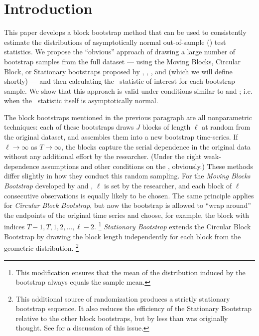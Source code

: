 \documentclass[12pt,fleqn]{article}
\begin{document}
\section{Introduction}

This paper develops a block bootstrap method that can be used to
consistently estimate the distributions of asymptotically normal
out-of-sample (\oos) test statistics. We propose the ``obvious''
approach of drawing a large number of bootstrap samples from the full
dataset --- using the Moving Blocks, Circular Block, or Stationary
bootstraps proposed by \cite{Kun:89}, \cite{LiS:92}, \cite{PoR:92},
and \cite{PoR:94} (which we will define shortly) --- and then
calculating the \oos\ statistic of interest for each bootstrap sample.
We show that this approach is valid under conditions similar to
 and ; i.e. when the \oos\ statistic
itself is asymptotically normal.

The block bootstraps mentioned in the previous paragraph are all
nonparametric techniques: each of these bootstraps draws $J$ blocks of
length $\ell$ at random from the original dataset, and assembles them
into a new bootstrap time-series. If $\ell \to \infty$ as $T \to
\infty$, the blocks capture the serial dependence in the original data
without any additional effort by the researcher. (Under the right
weak-dependence assumptions and other conditions on the \dgp,
obviously.) These methods differ slightly in how they conduct this
random sampling. For the \emph{Moving Blocks Bootstrap} developed by
\cite{Kun:89} and \cite{LiS:92}, $\ell$ is set by the researcher, and
each block of $\ell$ consecutive observations is equally likely to be
chosen. The same principle applies for  \emph{Circular
  Block Bootstrap}, but now the bootstrap is allowed to ``wrap
around'' the endpoints of the original time series and choose, for
example, the block with indices $T-1,T, 1, 2,\dots, \ell - 2$.%
\footnote{This modification ensures that the mean of the distribution
  induced by the bootstrap always equals the sample mean.} %
 \emph{Stationary Bootstrap} extends the Circular
Block Bootstrap by drawing the block length independently for each
block from the geometric distribution.%
\footnote{This additional source of randomization produces a strictly
  stationary bootstrap sequence. It also reduces the efficiency of the
  Stationary Bootstrap relative to the other block bootstraps, but by
  less than was originally thought. See \cite{Nor:09} for a discussion
  of this issue.}
\end{document}
